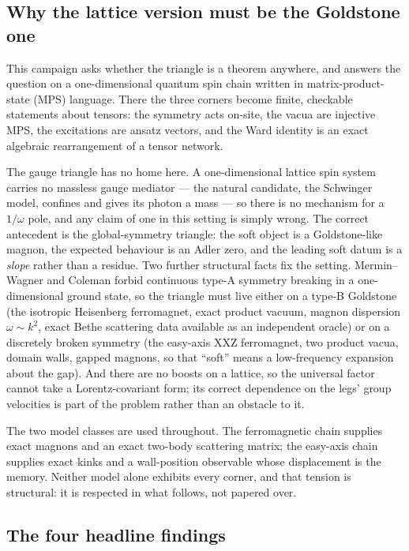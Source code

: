 \subsection{Why the lattice version must be the Goldstone one}

This campaign asks whether the triangle is a theorem anywhere, and answers
the question on a one-dimensional quantum spin chain written in
matrix-product-state (MPS) language. There the three corners become finite,
checkable statements about tensors: the symmetry acts on-site, the vacua are
injective MPS, the excitations are ansatz vectors, and the Ward identity is
an exact algebraic rearrangement of a tensor network.

The gauge triangle has no home here. A one-dimensional lattice spin system
carries no massless gauge mediator --- the natural candidate, the Schwinger
model, confines and gives its photon a mass --- so there is no mechanism for
a $1/\omega$ pole, and any claim of one in this setting is simply wrong. The
correct antecedent is the global-symmetry triangle: the soft object is a
Goldstone-like magnon, the expected behaviour is an Adler zero, and the
leading soft datum is a \emph{slope} rather than a residue. Two further
structural facts fix the setting. Mermin--Wagner and Coleman forbid
continuous type-A symmetry breaking in a one-dimensional ground state, so the
triangle must live either on a type-B Goldstone (the isotropic Heisenberg
ferromagnet, exact product vacuum, magnon dispersion $\omega\sim k^2$, exact
Bethe scattering data available as an independent oracle) or on a discretely
broken symmetry (the easy-axis XXZ ferromagnet, two product vacua, domain
walls, gapped magnons, so that ``soft'' means a low-frequency expansion about
the gap). And there are no boosts on a lattice, so the universal factor
cannot take a Lorentz-covariant form; its correct dependence on the legs'
group velocities is part of the problem rather than an obstacle to it.

The two model classes are used throughout. The ferromagnetic chain supplies
exact magnons and an exact two-body scattering matrix; the easy-axis chain
supplies exact kinks and a wall-position observable whose displacement is the
memory. Neither model alone exhibits every corner, and that tension is
structural: it is respected in what follows, not papered over.

\subsection{The four headline findings}

